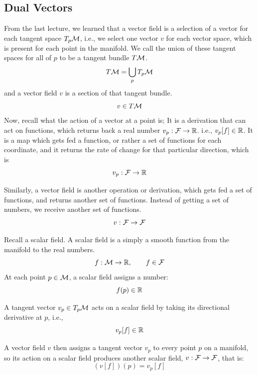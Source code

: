 
\subsection{Dual Vectors}

	From the last lecture, we learned that a vector field is a selection
	of a vector for each tangent space $T_p \mathcal M$, i.e., we select one
	vector $v$ for each vector space, which is present for each point in the 
	manifold. We call the union of these tangent spaces for all of $p$ to be
	a tangent bundle $T\mathcal M$.
	\[
		T\mathcal M = \bigcup_p T_p \mathcal M
	\]
	and a vector field $v$ is a section of that tangent bundle.
	\[
		v \in T\mathcal M
	\]
	Now, recall what the action of a vector at a point is; It is a derivation that can
	act on functions, which returns back a real number $v_p: \mathcal F \to \mathbb{R}$. i.e., $v_p[f]\in\mathbb{R}$. It 
	is a map which gets fed a function, or rather a set of functions for each 
	coordinate, and it returns the rate of change for that particular direction, which is 
	\[
		v_p:\mathcal{F} \to \mathbb{R}
	\]

	Similarly, a vector field is another operation or derivation, which gets fed a set
	of functions, and returns another set of functions. Instead of getting a set of numbers, we 
	receive another set of functions.
	\[
		v:\mathcal{F}\to\mathcal{F}
	\]

	Recall a scalar field. A scalar field is a simply a smooth function from the manifold to the real numbers.
	\[
		f:\mathcal M \to \mathbb{R},\qquad f\in\mathcal{F}
	\]
	At each point $p\in\mathcal M$, a scalar field assigns a number:
	\[
		f(p)\in\mathbb{R}
	\]

	A tangent vector $v_p\in T_p\mathcal M$ acts on a scalar field by taking its directional
	derivative at $p$, i.e.,
	\[
		v_p[f]\in\mathbb{R}
	\]

	A vector field $v$ then assigns a tangent vector $v_p$ to every point $p$ on a manifold, so its action
	on a scalar field produces another scalar field, $v:\mathcal{F}\to\mathcal{F}$, that is:
	\[
		(v[f])(p) = v_p[f]
	\]

